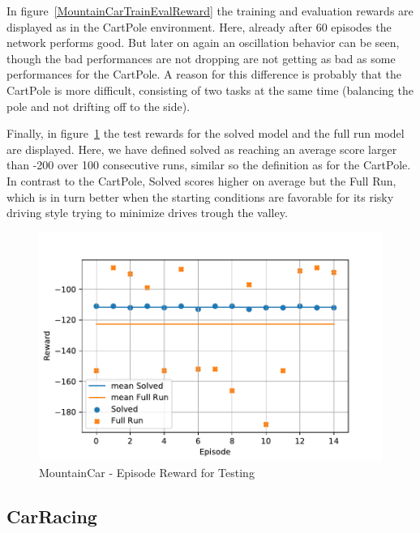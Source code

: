 \documentclass[
        a4paper,
        10pt,
        parskip = full,    %
    ]{scrartcl}
\begin{document}
In figure~\ref{MountainCarTrainEvalReward} the training and evaluation rewards
are displayed as in the CartPole environment. Here, already after 60
episodes the network performs good. But later on again an oscillation behavior
can be seen, though the bad performances are not dropping are not getting as bad
as some performances for the CartPole. A reason for this difference is probably
that the CartPole is more difficult, consisting of two tasks at the same time
(balancing the pole and not drifting off to the side).

Finally, in figure~\ref{MountainCarTestReward} the test rewards for the
solved model and the full run model are displayed. Here, we have defined solved
as reaching an average score larger than -200 over 100 consecutive runs,
similar so the definition as for the CartPole. In contrast to the CartPole,
Solved scores higher on average but the Full Run, which is in turn better when
the starting conditions are favorable for its risky driving style trying to
minimize drives trough the valley.

\begin{figure}[H]
  \begin{center}
    \includegraphics{./images/MountainCar-v0/tb_test_reward.pdf}
    \caption{MountainCar - Episode Reward for Testing}
    \label{MountainCarTestReward}
  \end{center}
\end{figure}






\subsection{CarRacing}
\end{document}
